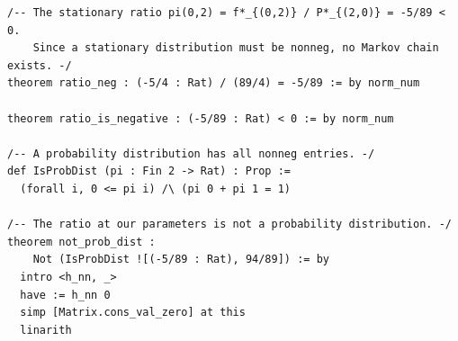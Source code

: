 \begin{lstlisting}[language=Lean4,caption={Lean 4 formalization of Problem 3 (verified, 0 \texttt{sorry})}]
/-- The stationary ratio pi(0,2) = f*_{(0,2)} / P*_{(2,0)} = -5/89 < 0.
    Since a stationary distribution must be nonneg, no Markov chain exists. -/
theorem ratio_neg : (-5/4 : Rat) / (89/4) = -5/89 := by norm_num

theorem ratio_is_negative : (-5/89 : Rat) < 0 := by norm_num

/-- A probability distribution has all nonneg entries. -/
def IsProbDist (pi : Fin 2 -> Rat) : Prop :=
  (forall i, 0 <= pi i) /\ (pi 0 + pi 1 = 1)

/-- The ratio at our parameters is not a probability distribution. -/
theorem not_prob_dist :
    Not (IsProbDist ![(-5/89 : Rat), 94/89]) := by
  intro <h_nn, _>
  have := h_nn 0
  simp [Matrix.cons_val_zero] at this
  linarith
\end{lstlisting}
